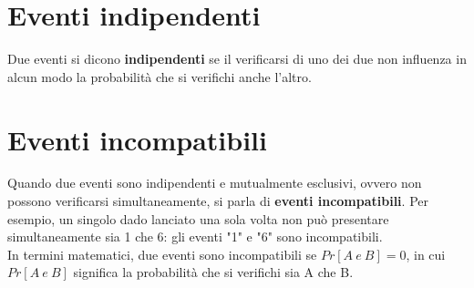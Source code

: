 \documentclass[drafts, 10pt]{book}
\begin{document}
\section{Eventi indipendenti}
Due eventi si dicono \textbf{indipendenti} se il verificarsi di uno dei due non influenza in alcun modo la probabilità che si verifichi anche l'altro.

\section{Eventi incompatibili}
Quando due eventi sono indipendenti e mutualmente esclusivi, ovvero non possono verificarsi simultaneamente, si parla di \textbf{eventi incompatibili}. Per esempio, un singolo dado lanciato una sola volta non può presentare simultaneamente sia 1 che 6: gli eventi "1" e "6" sono incompatibili.
\\
In termini matematici, due eventi sono incompatibili se $Pr[A\ e\ B]=0$, in cui $Pr[A\ e\ B]$ significa la probabilità che si verifichi sia A che B.
\end{document}
